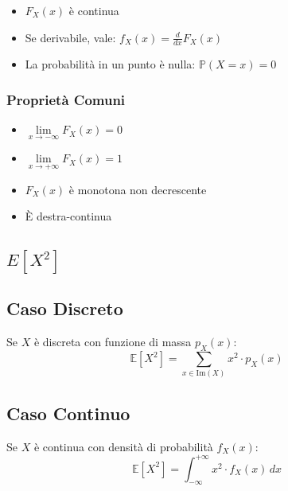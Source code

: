 \documentclass{article}
\begin{document}
\begin{itemize}
  \item $F_X(x)$ è continua
  \item Se derivabile, vale: $f_X(x) = \frac{d}{dx}F_X(x)$
  \item La probabilità in un punto è nulla: $\mathbb{P}(X = x) = 0$
\end{itemize}

\subsubsection*{Proprietà Comuni}
\begin{itemize}
  \item $\lim\limits_{x \to -\infty} F_X(x) = 0$
  \item $\lim\limits_{x \to +\infty} F_X(x) = 1$
  \item $F_X(x)$ è monotona non decrescente
  \item È destra-continua
\end{itemize}

\subsection*{${E}[X^2]$}

\subsection*{Caso Discreto}
Se $X$ è discreta con funzione di massa $p_X(x)$:
\[
\mathbb{E}[X^2] = \sum_{x \in \text{Im}(X)} x^2 \cdot p_X(x)
\]

\subsection*{Caso Continuo}
Se $X$ è continua con densità di probabilità $f_X(x)$:
\[
\mathbb{E}[X^2] = \int_{-\infty}^{+\infty} x^2 \cdot f_X(x) \, dx
\]
\end{document}
